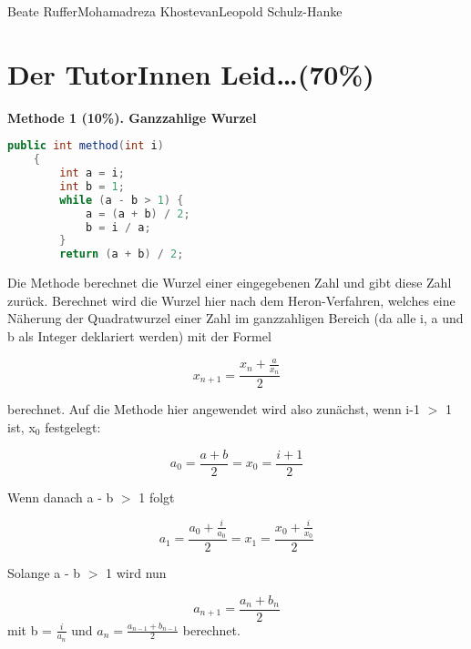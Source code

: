 \documentclass{pi1}
\begin{document}
		{Beate Ruffer}{Mohamadreza Khostevan}{Leopold Schulz-Hanke}

\section{Der TutorInnen Leid\ldots (70\%)}
\textbf{Methode 1 (10\%). Ganzzahlige Wurzel} 
\begin{lstlisting}[firstnumber=3, language=Java]
public int method(int i)
    {
        int a = i;
        int b = 1;
        while (a - b > 1) {
            a = (a + b) / 2;
            b = i / a;
        }
        return (a + b) / 2;
\end{lstlisting}

Die Methode berechnet die Wurzel einer eingegebenen Zahl und gibt diese Zahl zurück. Berechnet wird die Wurzel hier nach dem Heron-Verfahren, welches eine Näherung der Quadratwurzel einer Zahl im ganzzahligen Bereich (da alle i, a und b als Integer deklariert werden) mit der Formel 

\begin{displaymath}x_{n+1} = \frac{x_n + \frac{a}{x_n}}{2}\end{displaymath}

berechnet. Auf die Methode hier angewendet wird also zunächst, wenn i-1 $>$ 1 ist, x$_0$ festgelegt:

\begin{displaymath}a_0 = \frac{a + b}{2} = x_{0} = \frac{i + 1}{2} \end{displaymath}

Wenn danach a - b $>$ 1 folgt

\begin{displaymath} a_{1} = \frac{a_0 + \frac{i}{a_0}}{2} = x_{1} = \frac{x_0 + \frac{i}{x_0}}{2}\end{displaymath}

Solange a - b $>$ 1 wird nun

\begin{displaymath}a_{n+1} = \frac{a_n+b_n}{2}\end{displaymath}
mit b = $\frac{i}{a_n}$ und $a_n = \frac{a_{n-1}+b_{n-1}}{2}$ berechnet.
\end{document}
